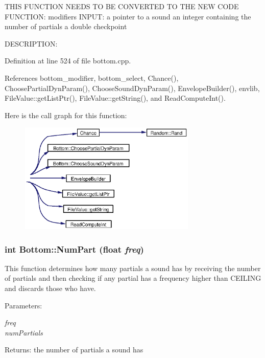 THIS FUNCTION NEEDS TO BE CONVERTED TO THE NEW CODE FUNCTION: modifiers INPUT: a pointer to a sound an integer containing the number of partials a double checkpoint

DESCRIPTION: 

Definition at line 524 of file bottom.cpp.

References bottom\_\-modifier, bottom\_\-select, Chance(), Choose\-Partial\-Dyn\-Param(), Choose\-Sound\-Dyn\-Param(), Envelope\-Builder(), envlib, File\-Value::get\-List\-Ptr(), File\-Value::get\-String(), and Read\-Compute\-Int().

Here is the call graph for this function:\begin{figure}[H]
\begin{center}
\leavevmode
\includegraphics[width=239pt]{classBottom_a23_cgraph}
\end{center}
\end{figure}
\subsubsection{\setlength{\rightskip}{0pt plus 5cm}int Bottom::Num\-Part (float {\em freq})}\label{classBottom_a15}


This function determines how many partials a sound has by receiving the number of partials and then checking if any partial has a frequency higher than CEILING and discards those who have. \begin{Desc}
\item[Parameters:]
\begin{description}
\item[{\em freq}]\item[{\em num\-Partials}]\end{description}
\end{Desc}
\begin{Desc}
\item[Returns:]the number of partials a sound has \end{Desc}


